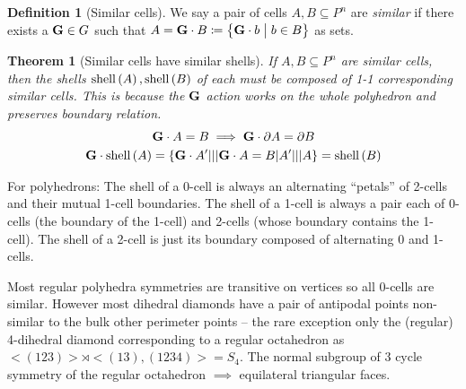 \documentclass{amsart}
\theoremstyle{plain}
\newtheorem{theorem}{Theorem}
\theoremstyle{definition}
\newtheorem*{definition}{Definition}
\begin{document}
 \begin{definition}[Similar cells]
    We say a pair of cells $A, B\subseteq P^n$ are \emph{similar} if there exists a $\mathbf{G}\in G$ such that $A=\mathbf{G}\cdot B\coloneqq\left\{\mathbf{G}\cdot b\hspace{1mm}\big|\hspace{1mm} b\in B\right\}$ as sets.
 \end{definition}
 \begin{theorem}[Similar cells have similar shells]
     If $A, B\subseteq P^n$ are similar cells, then the shells $\mathrm{shell}\left(A\right), \mathrm{shell}\left(B\right)$ of each must be composed of 1-1 corresponding similar cells. This is because the $\mathbf{G}$ action works on the whole polyhedron and preserves boundary relation.
     \begin{gather}
         \mathbf{G}\cdot A= B\implies \mathbf{G}\cdot \partial A = \partial B\\
         \mathbf{G}\cdot \mathrm{shell}\left(A\right) = \{\mathbf{G}\cdot A'|||\mathbf{G}\cdot A = B|A'|||A\} = \mathrm{shell}\left(B\right)
     \end{gather}
    
 \end{theorem}
 For polyhedrons:
 The shell of a 0-cell is always an alternating ``petals'' of 2-cells and their mutual 1-cell boundaries. The shell of a 1-cell is always a pair each of 0-cells (the boundary of the 1-cell) and 2-cells (whose boundary contains the 1-cell). The shell of a 2-cell is just its boundary composed of alternating 0 and 1-cells.

 Most regular polyhedra symmetries are transitive on vertices so all 0-cells are similar. However most dihedral diamonds have a pair of antipodal points non-similar to the bulk other perimeter points -- the rare exception only the (regular) 4-dihedral diamond corresponding to a regular octahedron as $<(123)>\rtimes <(13), (1234)> = S_4$. The normal subgroup of 3 cycle symmetry of the regular octahedron $\implies$ equilateral triangular faces.
 
\end{document}
